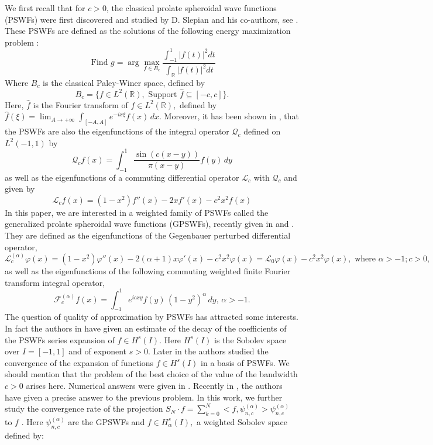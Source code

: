 \documentclass[]{article}
\newcommand{\ps}{\psi_{n,c}^{(\alpha)}}
\begin{document}
We first recall that for $c>0$, the classical prolate spheroidal wave functions (PSWFs) were first discovered and studied by D. Slepian and his co-authors, see \cite{Slepian1, Slepian2}. These PSWFs are defined as the solutions of the following energy maximization problem :
\begin{equation*}
\mbox{ Find } g=\arg\max_{f\in B_c}\frac{\int_{-1}^1|f(t)|^2 dt}{\int_{\mathbb{R}}|f(t)|^2 dt}
\end{equation*}
Where $B_c$ is the classical Paley-Winer space, defined by
\begin{equation}
\label{Bc}
B_c=\{ f\in L^2(\mathbb R),\,\, \mbox{Support } \widehat f\subseteq [-c,c]\}.
\end{equation}
Here, $\widehat f$ is the Fourier transform of $f\in L^2(\mathbb R),$ defined by ${\displaystyle \widehat f(\xi)=\lim_{A\rightarrow +\infty}\int_{[-A,A]} e^{-i x\xi} f(x)\, dx.}$
Moreover, it has been shown in \cite{Slepian1},  that the PSWFs are also the eigenfunctions of the integral operator ${\displaystyle \mathcal Q_c}$ defined on $L^2(-1,1)$ by $${\displaystyle \mathcal Q_c f(x)=\int_{-1}^1 \frac{\sin(c(x-y))}{\pi(x-y)} f(y)\, dy} $$ as well as the eigenfunctions of a  commuting differential operator $ \mathcal{L}_c$ with $ \mathcal{Q}_c$ and given by
$$ \mathcal L_c f(x)= (1-x^2)f''(x)-2x f'(x) - c^2 x^2 f(x) $$
In this paper, we are interested in a weighted family of PSWFs called the generalized prolate spheroidal wave functions (GPSWFs), recently given in \cite{Karoui-Souabni1} and\cite{Wang2} . They are defined as the eigenfunctions of the  Gegenbauer perturbed differential operator,
\begin{equation*}
\mathcal L^{(\alpha)}_c \varphi(x)= (1-x^2)\varphi''(x)-2\left(\alpha+1\right)x\varphi'(x) - c^2 x^2 \varphi(x)=
\mathcal L_0 \varphi(x)-c^2 x^2 \varphi(x), \mbox{ where } \alpha>-1; c>0,
\end{equation*}
as well as  the eigenfunctions of the following commuting  weighted finite Fourier transform integral operator,
\begin{equation} \label{integraloperator}
{\displaystyle \mathcal F_c^{(\alpha)} f(x)=\int_{-1}^1 e^{icxy}  f(y)\,(1-y^2)^{\alpha}\, dy,\, \alpha > -1.}
\end{equation}
The question of quality of approximation by PSWFs has attracted some interests. In fact the authors in \cite{chen} have given an estimate of the decay of the coefficients of the PSWFs series expansion of $f \in H^s(I)$. Here $ H^s(I)$ is the Sobolev space over $I=[-1,1]$ and of exponent $s>0$.  Later in \cite{Wang2} the authors studied the convergence of the expansion of functions $f \in H^s(I)$ in a basis of PSWFs. We should mention that the problem of the best choice of the value of the bandwidth $c>0$ arises here. Numerical answers were given in \cite{Wang2}. Recently in \cite{Bonami-Karoui4}, the authors have given a precise answer to the previous problem. In this work, we further study the convergence rate of the projection ${\displaystyle S_N \cdot f = \displaystyle \sum_{k=0}^N <f,\ps> \ps }$ to $f$ . Here $ \ps$ are the GPSWFs and $ f \in H^s_{\alpha}(I),$ a weighted Sobolev space defined by:
\end{document}
